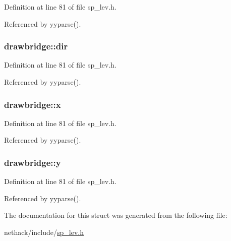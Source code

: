 Definition at line 81 of file sp\+\_\+lev.\+h.



Referenced by yyparse().

\hypertarget{structdrawbridge_a9ebf33f9dbeddea991e24bd689d54bdf}{
\subsubsection[{dir}]{ drawbridge\+::dir}}\label{structdrawbridge_a9ebf33f9dbeddea991e24bd689d54bdf}


Definition at line 81 of file sp\+\_\+lev.\+h.



Referenced by yyparse().

\hypertarget{structdrawbridge_a230d037c1c1042080df39dda677dd889}{
\subsubsection[{x}]{ drawbridge\+::x}}\label{structdrawbridge_a230d037c1c1042080df39dda677dd889}


Definition at line 81 of file sp\+\_\+lev.\+h.



Referenced by yyparse().

\hypertarget{structdrawbridge_a0916030cf787457a04c95cbbb7626f90}{
\subsubsection[{y}]{ drawbridge\+::y}}\label{structdrawbridge_a0916030cf787457a04c95cbbb7626f90}


Definition at line 81 of file sp\+\_\+lev.\+h.



Referenced by yyparse().



The documentation for this struct was generated from the following file\+:\begin{DoxyCompactItemize}
\item 
nethack/include/\hyperlink{sp__lev_8h}{sp\+\_\+lev.\+h}\end{DoxyCompactItemize}
